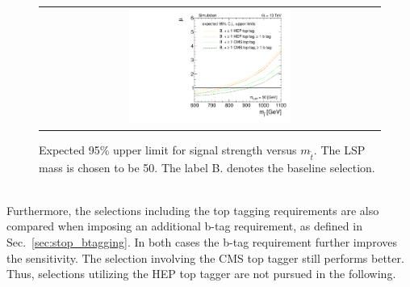 \begin{figure}[!t]
  \centering
  \begin{tabular}{c}
                \includegraphics[width=0.49\textwidth]{figures/limitplot4BinSel_BaselineBTagTopTag_LSP50.pdf} 
  \end{tabular}
  \caption{Expected 95\% upper limit for signal strength versus $m_{\tilde{t}}$. The LSP mass is chosen to be 50\gev. The label B. denotes the baseline selection.}
  \label{fig:stop_baselinetoptag_limit}
\end{figure}
\\
Furthermore, the selections including the top tagging requirements are also compared when imposing an additional b-tag requirement, as defined in Sec.~\ref{sec:stop_btagging}. In both cases the b-tag requirement further improves the sensitivity. The selection involving the CMS top tagger still performs better. Thus, selections utilizing the HEP top tagger are not pursued in the following.%


